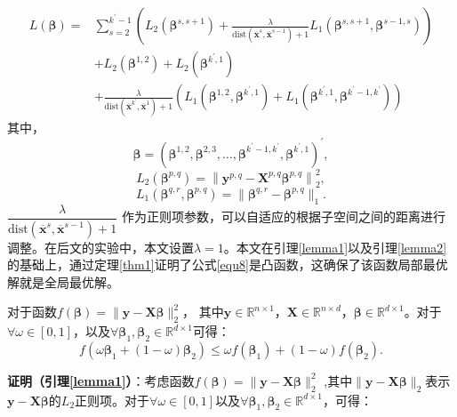 \documentclass{NauThesis}
\begin{document}
\begin{equation} \label{equ8}
    \begin{aligned}
        L(\boldsymbol{\beta}) = & \sum\limits_{s=2}^{k^\prime-1}\left(L_2(\boldsymbol{\beta}^{s,s+1}) + \frac{\lambda}{\text{dist}(\overline{\boldsymbol{x}}^{s}, \overline{\boldsymbol{x}}^{s-1}) + 1}L_1(\boldsymbol{\beta}^{s,s+1}, \boldsymbol{\beta}^{s-1,s}) \right) \\
        & + L_2(\boldsymbol{\beta}^{1,2}) + L_2(\boldsymbol{\beta}^{k^\prime,1})\\
        &+ \frac{\lambda}{\text{dist}(\overline{\boldsymbol{x}}^{k^\prime}, \overline{\boldsymbol{x}}^{1}) + 1}(L_1(\boldsymbol{\beta}^{1,2}, \boldsymbol{\beta}^{k^\prime,1})+L_1(\boldsymbol{\beta}^{k^\prime,1},
        \boldsymbol{\beta}^{k^\prime-1,k^\prime}))
    \end{aligned}
\end{equation}
其中，$$\boldsymbol{\beta}=\left(\boldsymbol{\beta}^{1,2},\boldsymbol{\beta}^{2,3},\ldots,\boldsymbol{\beta}^{k^\prime-1,k^\prime},\boldsymbol{\beta}^{k^\prime,1}\right)^\prime,$$ 
$$L_2(\boldsymbol{\beta}^{p,q})=\left\|\boldsymbol{y}^{p, q}-\boldsymbol{X}^{p, q} \boldsymbol{\beta}^{p, q}\right\|_{2}^{2},$$ $$L_1(\boldsymbol{\beta}^{q,r},\boldsymbol{\beta}^{p,q})=\|\boldsymbol{\beta}^{q,r}-\boldsymbol{\beta}^{p,q}\|_1.$$ $\dfrac{\lambda}{\text{dist}(\overline{\boldsymbol{x}}^{s},\overline{\boldsymbol{x}}^{s-1})+1}$
作为正则项参数，可以自适应的根据子空间之间的距离进行调整。在后文的实验中，本文设置$\lambda=1$。本文在引理\ref{lemma1}以及引理\ref{lemma2}的基础上，通过定理\ref{thm1}证明了公式\eqref{equ8}是凸函数，这确保了该函数局部最优解就是全局最优解。
\begin{lemma}
    \label{lemma1}
	对于函数$f(\boldsymbol{\beta})=\|\boldsymbol{y}-\boldsymbol{X}\boldsymbol{\beta}\|_2^2$，
    其中$\boldsymbol{y}\in\mathbb{R}^{n\times1}$，$\boldsymbol{X}\in\mathbb{R}^{n\times d}$，$\boldsymbol{\beta}\in\mathbb{R}^{d\times1}$。对于$\forall\omega\in[0,1]$，以及$\forall\boldsymbol{\beta}_1,\boldsymbol{\beta}_2\in\mathbb{R}^{d\times1}$可得：
    \begin{equation}
        f(\omega\boldsymbol{\beta}_1+(1-\omega)\boldsymbol{\beta}_2)\le\omega f(\boldsymbol{\beta}_1)+(1-\omega)f(\boldsymbol{\beta}_2).
    \end{equation}
\end{lemma}
\noindent \textbf{证明（引理\ref{lemma1}）}：考虑函数$f(\boldsymbol{\beta})=\|\boldsymbol{y}-\boldsymbol{X}\boldsymbol{\beta}\|_2^2$
,其中$\|\boldsymbol{y}-\boldsymbol{X}\boldsymbol{\beta}\|_2$表示$\boldsymbol{y}-\boldsymbol{X}\boldsymbol{\beta}$的$L_2$正则项。对于$\forall\omega\in[0,1]$以及$\forall\boldsymbol{\beta}_1,\boldsymbol{\beta}_2\in\mathbb{R}^{d\times1}$，可得：
\end{document}
